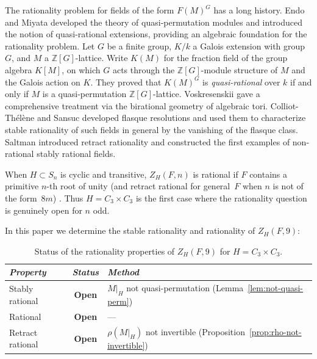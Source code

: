 \documentclass[12pt,a4paper]{article}
\theoremstyle{definition}
\begin{document}
The rationality problem for fields of the form \(F(M)^G\) has a long
history.
Endo and Miyata \cite[\S1]{EndoMiyata1973b} developed the theory
of quasi-permutation modules and introduced the notion of quasi-rational
extensions, providing an algebraic foundation for the rationality problem. 
Let \(G\) be a finite group, \(K/k\) a Galois extension with group \(G\),
and \(M\) a \(\mathbb{Z}[G]\)-lattice.  Write \(K(M)\) for the fraction
field of the group algebra \(K[M]\), on which \(G\) acts through the
\(\mathbb{Z}[G]\)-module structure of \(M\) and the Galois action on
\(K\).  They proved \cite[Theorem~1.6]{EndoMiyata1973a} that \(K(M)^G\)
is \emph{quasi-rational} over \(k\) if and only if \(M\) is a
quasi-permutation \(\mathbb{Z}[G]\)-lattice.
Voskresenskii \cite[Chapter~2]{Vos98} gave a comprehensive
treatment via the birational geometry of algebraic tori. 
Colliot-Th\'el\`ene and Sansuc \cite[\S1]{CTS77} developed flasque
resolutions and used them to characterize stable rationality of such
fields in general by the vanishing of the flasque class. 
Saltman \cite[Section~3]{Saltman1984} introduced retract rationality and
constructed the first examples of non-rational stably rational fields. 

When \(H \subset S_n\) is cyclic and transitive,
\(Z_H(F,n)\) is rational if \(F\) contains a primitive \(n\)-th root of unity
(and retract rational for general~\(F\) when \(n\) is not of the form~\(8m\))
\cite[pp.\ 234]{ABGV2011}.
Thus \(H = C_3 \times C_3\) is the first case where the rationality
question is genuinely open for \(n\) odd.

In this paper we determine the stable rationality and rationality of
\(Z_H(F,9)\):
\begin{table}[tbp]
\centering
\begin{tabular}{lcp{5.5cm}}
\hline
\emph{Property} & \emph{Status} & \emph{Method} \\
\hline
Stably rational & \textbf{Open}
& \(M|_H\) not quasi-permutation (Lemma~\ref{lem:not-quasi-perm}) \\
Rational & \textbf{Open} & --- \\
Retract rational & \textbf{Open}
& \(\rho(M|_H)\) not invertible (Proposition~\ref{prop:rho-not-invertible}) \\
\hline
\end{tabular}
\caption{Status of the rationality properties of \(Z_H(F,9)\) for
\(H = C_3 \times C_3\).}
\label{tab:main}
\end{table}
\end{document}

